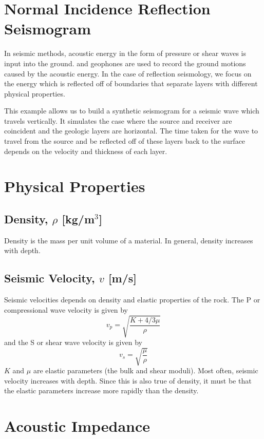 \documentclass{article}[11pt,oneside]
\begin{document}

\section*{Normal Incidence Reflection Seismogram}
In seismic methods, acoustic energy in the form of pressure or shear waves is input into the ground.
and geophones are used to record the ground motions caused by the acoustic energy. In the case of reflection seismology, we focus on the energy which is reflected off of boundaries that separate layers with different physical properties.

This example allows us to build a synthetic seismogram for a seismic wave which travels vertically. It simulates the case where the source and receiver are coincident and the geologic layers are horizontal. The time taken for the wave to travel from the source and be reflected off of these layers back to the surface depends on the velocity and thickness of each layer.


\section*{Physical Properties}
\subsection*{Density, $\rho$ [kg/m$^3$]}
Density is the mass per unit volume of a material. In general, density increases with depth.

\subsection*{Seismic Velocity, $v$ [m/s]}
Seismic velocities depends on density and elastic properties of the rock. The P or compressional wave velocity is given by
$$v_p = \sqrt{\frac{K + 4/3\mu}{\rho}}$$
and the S or shear wave velocity is given by
$$v_s = \sqrt{\frac{\mu}{\rho}}$$
$K$ and $\mu$ are elastic parameters (the bulk and shear moduli). Most often, seismic velocity increases with depth. Since this is also true of density, it must be that the elastic parameters increase more rapidly than the density.


\section*{Acoustic Impedance}
\end{document}
